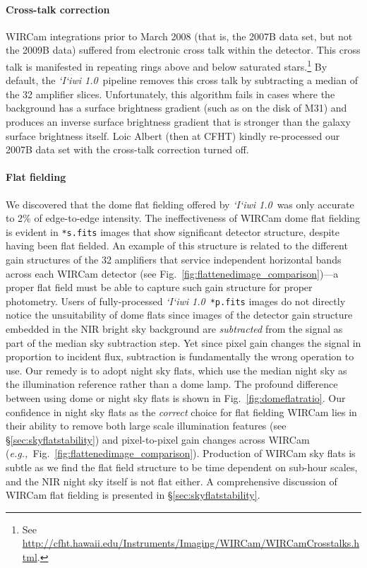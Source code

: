 \documentclass[iop]{emulateapj}
\newcommand{\eg}{\textit{e.g.,~}}
\newcommand{\sw}[1]{\textit{#1}} %
\newcommand{\iiwione}{\sw{`I`iwi 1.0}}
\newcommand{\Fig}[1]{Fig.~\ref{fig:#1}}  %
\newcommand{\Sec}[1]{\S\ref{sec:#1}}  %
\begin{document}
\paragraph{Cross-talk correction} WIRCam integrations prior to March 2008 (that is, the 2007B data set, but not the 2009B data) suffered from electronic cross talk within the detector.
This cross talk is manifested in repeating rings above and below saturated stars.\footnote{See \url{http://cfht.hawaii.edu/Instruments/Imaging/WIRCam/WIRCamCrosstalks.html}.}
By default, the \iiwione\ pipeline removes this cross talk by subtracting a median of the 32 amplifier slices.
Unfortunately, this algorithm fails in cases where the background has a surface brightness gradient (such as on the disk of M31) and produces an inverse surface brightness gradient that is stronger than the galaxy surface brightness itself.
Loic Albert (then at CFHT) kindly re-processed our 2007B data set with the cross-talk correction turned off.

\paragraph{Flat fielding} We discovered that the dome flat fielding offered by \iiwione\ was only accurate to 2\% of edge-to-edge intensity.
The ineffectiveness of WIRCam dome flat fielding is evident in \texttt{*s.fits} images that show significant detector structure, despite having been flat fielded.
An example of this structure is related to the different gain structures of the 32 amplifiers that service independent horizontal bands across each WIRCam detector (see \Fig{flattenedimage_comparison})---a proper flat field must be able to capture such gain structure for proper photometry.
Users of fully-processed \iiwione\ \texttt{*p.fits} images do not directly notice the unsuitability of dome flats since images of the detector gain structure embedded in the NIR bright sky background are \textit{subtracted} from the signal as part of the median sky subtraction step.
Yet since pixel gain changes the signal in proportion to incident flux, subtraction is fundamentally the wrong operation to use.
Our remedy is to adopt night sky flats, which use the median night sky as the illumination reference rather than a dome lamp.
The profound difference between using dome or night sky flats is shown in \Fig{domeflatratio}.
Our confidence in night sky flats as the \textit{correct} choice for flat fielding WIRCam lies in their ability to remove both large scale illumination features (see \Sec{skyflatstability}) and pixel-to-pixel gain changes across WIRCam (\eg \Fig{flattenedimage_comparison}).
Production of WIRCam sky flats is subtle as we find the flat field structure to be time dependent on sub-hour scales, and the NIR night sky itself is not flat either.
A comprehensive discussion of WIRCam flat fielding is presented in \Sec{skyflatstability}.
\end{document}
